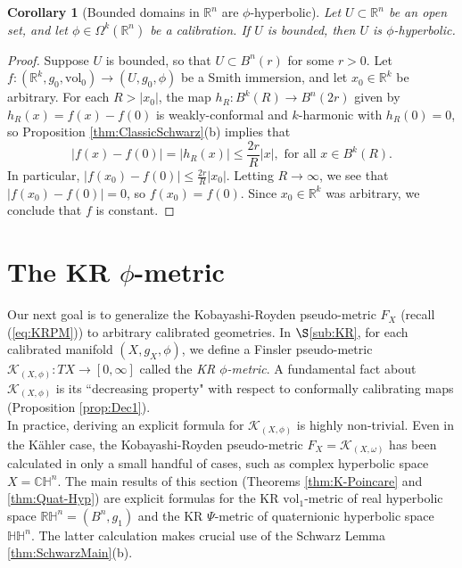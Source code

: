 \documentclass[11pt]{article}
\newcommand{\R}{\mathbb{R}}
\newcommand{\vol}{\mathrm{vol}}
\newtheorem{cor}[thm]{Corollary}
\theoremstyle{definition}
\numberwithin{equation}{section}
\begin{document}
\begin{cor}[Bounded domains in $\R^n$ are $\phi$-hyperbolic] \label{cor:BoundedDomains} Let $U \subset \R^n$ be an open set, and let $\phi \in \Omega^k(\R^n)$ be a calibration.  If $U$ is bounded, then $U$ is $\phi$-hyperbolic.
\end{cor}

\begin{proof} Suppose $U$ is bounded, so that $U \subset B^n(r)$ for some $r > 0$.  Let $f \colon (\R^k, g_0, \vol_0) \to (U, g_0, \phi)$ be a Smith immersion, and let $x_0 \in \R^k$ be arbitrary.  For each $R > |x_0|$, the map $h_R \colon B^k(R) \to B^n(2r)$ given by $h_R(x) = f(x) - f(0)$ is weakly-conformal and $k$-harmonic with $h_R(0) = 0$, so Proposition \ref{thm:ClassicSchwarz}(b) implies that
$$| f(x) - f(0) | =  | h_R(x) | \leq \frac{2r}{R}|x|, \text{ for all }x \in B^k(R).$$
In particular, $\left| f(x_0) - f(0) \right| \leq \frac{2r}{R}|x_0|$.  Letting $R \to \infty$, we see that $|f(x_0) - f(0)| = 0$, so $f(x_0) = f(0)$.  Since $x_0 \in \R^k$ was arbitrary, we conclude that $f$ is constant.
\end{proof}

\section{The KR $\phi$-metric}

\indent \indent Our next goal is to generalize the Kobayashi-Royden pseudo-metric $F_X$ (recall (\ref{eq:KRPM})) to arbitrary calibrated geometries.  In $\S$\ref{sub:KR}, for each calibrated manifold $(X,g_X, \phi)$, we define a Finsler pseudo-metric $\mathcal{K}_{(X,\phi)} \colon TX \to [0,\infty]$ called the \emph{KR $\phi$-metric}.  A fundamental fact about $\mathcal{K}_{(X,\phi)}$ is its ``decreasing property" with respect to conformally calibrating maps (Proposition \ref{prop:Dec1}). \\
\indent In practice, deriving an explicit formula for $\mathcal{K}_{(X,\phi)}$ is highly non-trivial.  Even in the K\"{a}hler case, the Kobayashi-Royden pseudo-metric $F_X = \mathcal{K}_{(X,\omega)}$ has been calculated in only a small handful of cases, such as complex hyperbolic space $X = \mathbb{CH}^n$.  The main results of this section (Theorems \ref{thm:K-Poincare} and \ref{thm:Quat-Hyp}) are explicit formulas for the KR $\vol_1$-metric of real hyperbolic space $\mathbb{RH}^n = (B^n, g_1)$ and the KR $\Psi$-metric of quaternionic hyperbolic space $\mathbb{HH}^n$.  The latter calculation makes crucial use of the Schwarz Lemma \ref{thm:SchwarzMain}(b).
\end{document}
